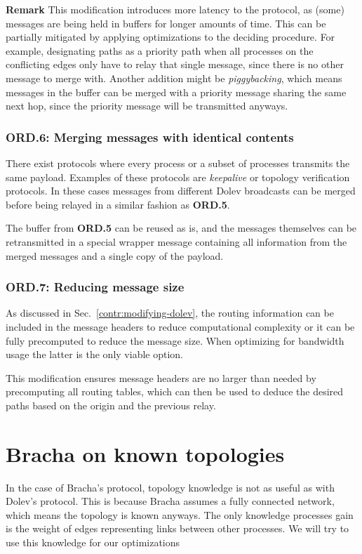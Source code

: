 \textbf{Remark}
This modification introduces more latency to the protocol, as (some) messages are being held in buffers for longer amounts of time. This can be partially mitigated by applying optimizations to the deciding procedure. For example, designating paths as a priority path when all processes on the conflicting edges only have to relay that single message, since there is no other message to merge with. Another addition might be \textit{piggybacking}, which means messages in the buffer can be merged with a priority message sharing the same next hop, since the priority message will be transmitted anyways.


\subsubsection{ORD.6: Merging messages with identical contents}
There exist protocols where every process or a subset of processes transmits the same payload. Examples of these protocols are \textit{keepalive} or topology verification protocols. In these cases messages from different Dolev broadcasts can be merged before being relayed in a similar fashion as \textbf{ORD.5}.

The buffer from \textbf{ORD.5} can be reused as is, and the messages themselves can be retransmitted in a special wrapper message containing all information from the merged messages and a single copy of the payload.

\subsubsection{ORD.7: Reducing message size}
As discussed in Sec.~\ref{contr:modifying-dolev}, the routing information can be included in the message headers to reduce computational complexity or it can be fully precomputed to reduce the message size. When optimizing for bandwidth usage the latter is the only viable option. 

This modification ensures message headers are no larger than needed by precomputing all routing tables, which can then be used to deduce the desired paths based on the origin and the previous relay. 


\section{Bracha on known topologies}
\label{contr-bracha}
In the case of Bracha's protocol, topology knowledge is not as useful as with Dolev's protocol. This is because Bracha assumes a fully connected network, which means the topology is known anyways. The only knowledge processes gain is the weight of edges representing links between other processes. We will try to use this knowledge for our optimizations

